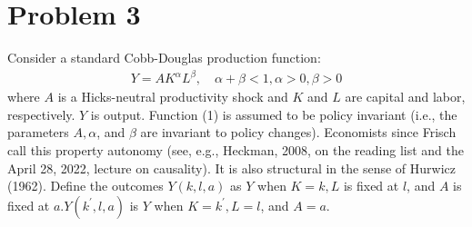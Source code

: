 \documentclass{article}
\begin{document}
\section*{Problem 3}
Consider a standard Cobb-Douglas production function:
\begin{align}\label{eq:eq1p3}
Y=A K^{\alpha} L^{\beta}, \quad \alpha+\beta<1, \alpha>0, \beta>0
\end{align}
where $A$ is a Hicks-neutral productivity shock and $K$ and $L$ are capital and labor, respectively. $Y$ is output. Function (1) is assumed to be policy invariant (i.e., the parameters $A, \alpha$, and $\beta$ are invariant to policy changes). Economists since Frisch call this property autonomy (see, e.g., Heckman, 2008, on the reading list and the April 28, 2022, lecture on causality). It is also structural in the sense of Hurwicz (1962). Define the outcomes $Y(k, l, a)$ as $Y$ when $K=k, L$ is fixed at $l$, and $A$ is fixed at $a . Y\left(k^{\prime}, l, a\right)$ is $Y$ when $K=k^{\prime}, L=l$, and $A=a$.
 
\end{document}
